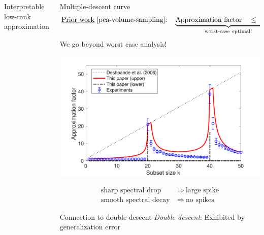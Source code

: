\documentclass{beamer}
\begin{document}
\begin{frame}
\begin{columns}
\begin{column}{0.32\textwidth}
\begin{block}{Interpretable low-rank approximation}
\end{block}

  \end{column}


  \begin{column}{0.32\textwidth}

    
    \begin{block}{Multiple-descent curve}
        \begin{align*}
\text{\underline{Prior work}~\cite{pca-volume-sampling}:}\quad
    \underbrace{\text{Approximation
    factor}\quad
\leq\quad k+1}_{\text{worst-case optimal!}} %
  \end{align*}
  We go beyond worst case analysis!\vspace{2mm}
  
    \includegraphics[width=\textwidth]{../figs/nystrom/nystrom-bounds}

    \vspace{-4mm}    
    \begin{align*}
      \text{sharp spectral drop}\ &\Longrightarrow\ \text{large spike}\\[2mm]
      \text{smooth spectral decay}\ &\Longrightarrow\ \text{no spikes}
    \end{align*}

    
  \end{block}

  
  \begin{block}{Connection to double descent}
  \emph{Double descent}: Exhibited by generalization error \cite{BHMM19}
  \vspace{1cm}
  

\end{block}
\end{column}
\end{columns}
\end{frame}
\end{document}
